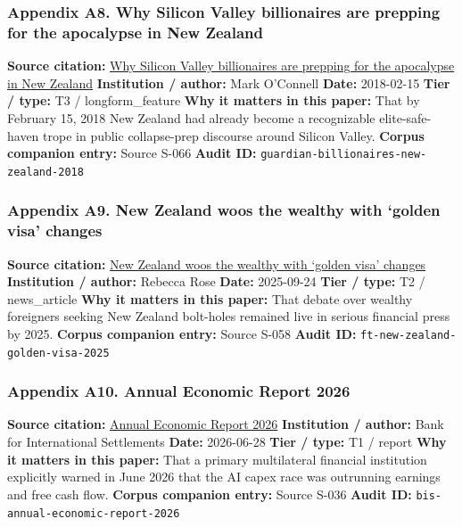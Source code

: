 \documentclass[
  american,
  11pt,
  letterpaper,
]{article}
\begin{document}
\subsubsection{Appendix A8. Why Silicon Valley billionaires are prepping
for the apocalypse in New
Zealand}\label{appendix-a8-why-silicon-valley-billionaires-are-prepping-for-the-apocalypse-in-new-zealand}

\textbf{Source citation:}
\href{https://www.theguardian.com/news/2018/feb/15/why-silicon-valley-billionaires-are-prepping-for-the-apocalypse-in-new-zealand}{Why
Silicon Valley billionaires are prepping for the apocalypse in New
Zealand} \textbf{Institution / author:} Mark O'Connell \textbf{Date:}
2018-02-15 \textbf{Tier / type:} T3 / longform\_feature \textbf{Why it
matters in this paper:} That by February 15, 2018 New Zealand had
already become a recognizable elite-safe-haven trope in public
collapse-prep discourse around Silicon Valley. \textbf{Corpus companion
entry:} Source S-066 \textbf{Audit ID:}
\texttt{guardian-billionaires-new-zealand-2018}

\subsubsection{Appendix A9. New Zealand woos the wealthy with `golden
visa'
changes}\label{appendix-a9-new-zealand-woos-the-wealthy-with-golden-visa-changes}

\textbf{Source citation:}
\href{https://www.ft.com/content/76ca455c-3b16-4413-8738-3f17431d125b}{New
Zealand woos the wealthy with `golden visa' changes} \textbf{Institution
/ author:} Rebecca Rose \textbf{Date:} 2025-09-24 \textbf{Tier / type:}
T2 / news\_article \textbf{Why it matters in this paper:} That debate
over wealthy foreigners seeking New Zealand bolt-holes remained live in
serious financial press by 2025. \textbf{Corpus companion entry:} Source
S-058 \textbf{Audit ID:} \texttt{ft-new-zealand-golden-visa-2025}

\subsubsection{Appendix A10. Annual Economic Report
2026}\label{appendix-a10-annual-economic-report-2026}

\textbf{Source citation:}
\href{https://www.bis.org/publ/arpdf/ar2026e.pdf}{Annual Economic Report
2026} \textbf{Institution / author:} Bank for International Settlements
\textbf{Date:} 2026-06-28 \textbf{Tier / type:} T1 / report \textbf{Why
it matters in this paper:} That a primary multilateral financial
institution explicitly warned in June 2026 that the AI capex race was
outrunning earnings and free cash flow. \textbf{Corpus companion entry:}
Source S-036 \textbf{Audit ID:} \texttt{bis-annual-economic-report-2026}
\end{document}
